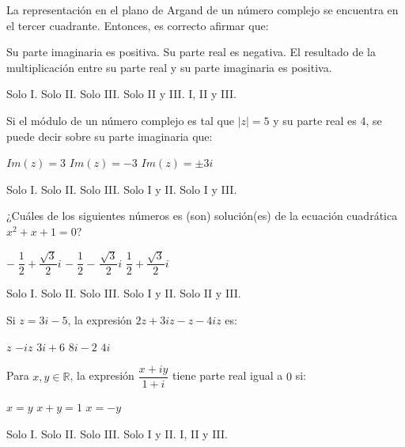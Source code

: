 \documentclass[]{srs}
\begin{document}
\begin{preguntas}[after-item-skip=2cm]
\pregunta La representación en el plano de Argand de un número complejo se encuentra
en el tercer cuadrante. Entonces, es correcto afirmar que:\\
\begin{vertical*}
  \alternativa Su parte imaginaria es positiva.
  \alternativa Su parte real es negativa.
  \alternativa El resultado de la multiplicación entre su parte real y
  su parte imaginaria es positiva.
\end{vertical*}
\begin{vertical}
  \alternativa Solo I.
  \alternativa Solo II.
  \alternativa Solo III.
  \alternativa Solo II y III.
  \alternativa I, II y III.
\end{vertical}


\pregunta Si el módulo de un número complejo es tal que $|z|=5$ y su parte real es 4,
se puede decir sobre su parte imaginaria que:\\
\begin{vertical*}
  \alternativa $Im(z)=3$
  \alternativa $Im(z)=-3$
  \alternativa $Im(z)=\pm 3i$
\end{vertical*}
\begin{vertical}
  \alternativa Solo I.
  \alternativa Solo II.
  \alternativa Solo III.
  \alternativa Solo I y II.
  \alternativa Solo I y III.
\end{vertical}

\pregunta ¿Cuáles de los siguientes números es (son) solución(es) de la ecuación
cuadrática $x^2+x+1=0$?\\
\begin{vertical*}
  \alternativa $-\;\dfrac{1}{2}+\dfrac{\sqrt{3}}{2}i$
  \alternativa $-\;\dfrac{1}{2}-\,\dfrac{\sqrt{3}}{2}i$
  \alternativa $\dfrac{1}{2}+\dfrac{\sqrt{3}}{2}i$
\end{vertical*}
\begin{vertical}
  \alternativa Solo I.
  \alternativa Solo II.
  \alternativa Solo III.
  \alternativa Solo I y II.
  \alternativa Solo II y III.
\end{vertical}

\pregunta Si $z=3i-5$, la expresión $2z+3iz-z-4iz$ es:\\
\begin{vertical}
  \alternativa $z$
  \alternativa $-iz$
  \alternativa $3i+6$
  \alternativa $8i-2$
  \alternativa $4i$
\end{vertical}

\pregunta Para $x,y \in \mathbb{R}$, la expresión $\dfrac{x+iy}{1+i}$ tiene parte real igual
a $0$ si:\\
\begin{vertical*}
  \alternativa $x=y$
  \alternativa $x+y=1$
  \alternativa $x=-y$
\end{vertical*}
\begin{vertical}
  \alternativa Solo I.
  \alternativa Solo II.
  \alternativa Solo III.
  \alternativa Solo I y II.
  \alternativa I, II y III.
\end{vertical}



\end{preguntas}
\end{document}
